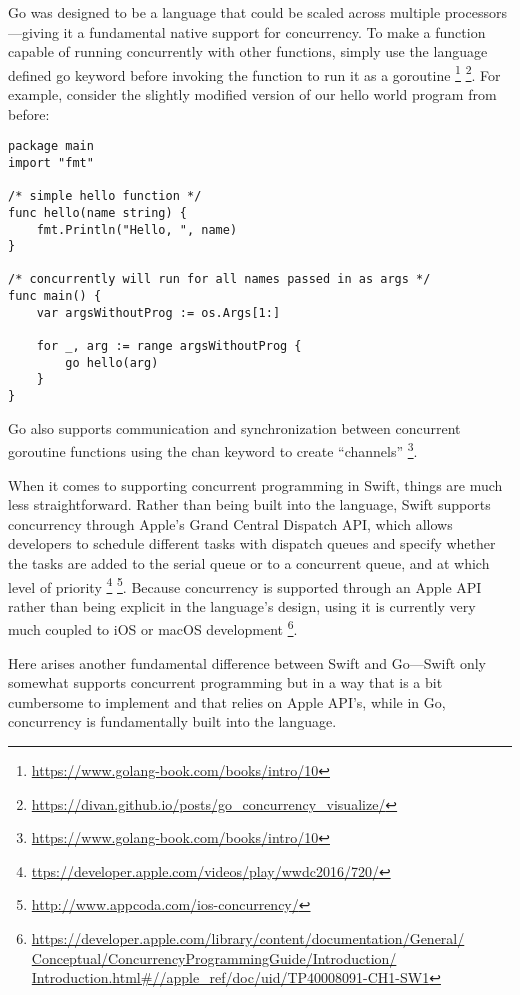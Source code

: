 \documentclass[letterpaper]{article}
\begin{document}
Go was designed to be a language that could be scaled across multiple processors—giving it a fundamental native support for concurrency. To make a function capable of running concurrently with other functions, simply use the language defined go keyword before invoking the function to run it as a goroutine \footnote{\url{https://www.golang-book.com/books/intro/10}} \footnote{\url{https://divan.github.io/posts/go_concurrency_visualize/}}. For example, consider the slightly modified version of our hello world program from before:

\begin{verbatim}
package main
import "fmt"

/* simple hello function */
func hello(name string) {
    fmt.Println("Hello, ", name)
}

/* concurrently will run for all names passed in as args */
func main() {
    var argsWithoutProg := os.Args[1:]

    for _, arg := range argsWithoutProg {
        go hello(arg)
    }
}
\end{verbatim}

Go also supports communication and synchronization between concurrent goroutine functions using the chan keyword to create “channels” \footnote{\url{https://www.golang-book.com/books/intro/10}}.

When it comes to supporting concurrent programming in Swift, things are much less straightforward. Rather than being built into the language, Swift supports concurrency through Apple’s Grand Central Dispatch API, which allows developers to schedule different tasks with dispatch queues and specify whether the tasks are added to the serial queue or to a concurrent queue, and at which level of priority \footnote{\url{ttps://developer.apple.com/videos/play/wwdc2016/720/}} \footnote{\url{http://www.appcoda.com/ios-concurrency/}}. Because concurrency is supported through an Apple API rather than being explicit in the language’s  design, using it is currently very much coupled to iOS or macOS development \footnote{\url{https://developer.apple.com/library/content/documentation/General/
Conceptual/ConcurrencyProgrammingGuide/Introduction/
Introduction.html#//apple_ref/doc/uid/TP40008091-CH1-SW1}}.

Here arises another fundamental difference between Swift and Go—Swift only somewhat supports concurrent programming but in a way that is a bit cumbersome to implement and that relies on Apple API's, while in Go, concurrency is fundamentally built into the language.
\end{document}
